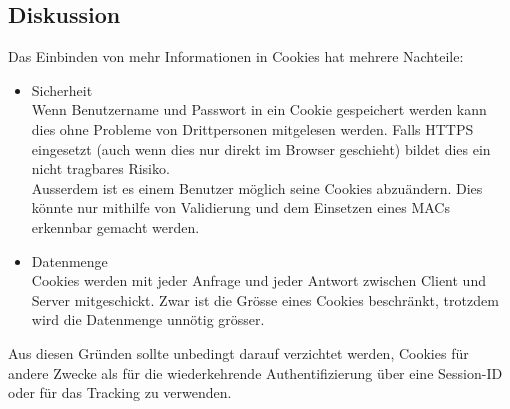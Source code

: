 \subsection*{Diskussion}
Das Einbinden von mehr Informationen in Cookies hat mehrere Nachteile:
\begin{itemize}
	\item Sicherheit \\
		Wenn Benutzername und Passwort in ein Cookie gespeichert werden kann dies ohne Probleme von Drittpersonen mitgelesen werden. Falls HTTPS eingesetzt (auch wenn dies nur direkt im Browser geschieht) bildet dies ein nicht tragbares Risiko. \\
		Ausserdem ist es einem Benutzer möglich seine Cookies abzuändern. Dies könnte nur mithilfe von Validierung und dem Einsetzen eines \glspl{MAC} erkennbar gemacht werden.
	\item Datenmenge \\
		Cookies werden mit jeder Anfrage und jeder Antwort zwischen Client und Server mitgeschickt. Zwar ist die Grösse eines Cookies beschränkt, trotzdem wird die Datenmenge unnötig grösser.
\end{itemize}

Aus diesen Gründen sollte unbedingt darauf verzichtet werden, Cookies für andere Zwecke als für die wiederkehrende Authentifizierung über eine Session-ID oder für das Tracking zu verwenden.